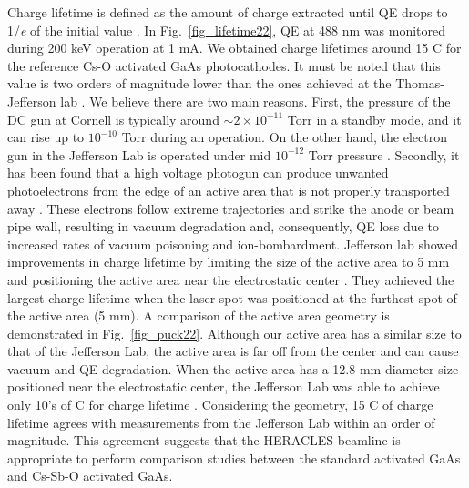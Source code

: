 Charge lifetime is defined as the amount of charge extracted until QE drops to 1/\emph{e} of the initial value \cite{grames2011_ChargeFluenceLifetime,bae2018_RuggedSpinpolarizedElectron}.
In Fig.~\ref{fig_lifetime22}, QE at 488 nm was monitored during 200 keV operation at 1 mA. 
We obtained charge lifetimes around 15 C for the reference Cs-O activated GaAs photocathodes.
It must be noted that this value is two orders of magnitude lower than the ones achieved at the Thomas-Jefferson lab \cite{grames2011_ChargeFluenceLifetime}.
We believe there are two main reasons.
First, the pressure of the DC gun at Cornell is typically around $\sim 2 \times 10^{-11}$ Torr in a standby mode, and it can rise up to $10^{-10}$ Torr during an operation. On the other hand, the electron gun in the Jefferson Lab is operated under mid $10^{-12}$ Torr pressure \cite{grames2011_ChargeFluenceLifetime}. Secondly, it has been found that a high voltage photogun can produce unwanted photoelectrons from the edge of an active area that is not properly transported away \cite{grames2011_ChargeFluenceLifetime,sinclair2007_DevelopmentHighAverage}. These electrons follow extreme trajectories and strike the anode or beam pipe wall, resulting in vacuum degradation and, consequently, QE loss due to increased rates of vacuum poisoning and ion-bombardment. Jefferson lab showed improvements in charge lifetime by limiting the size of the active area to 5 mm and positioning the active area near the electrostatic center \cite{grames2011_ChargeFluenceLifetime}.
They achieved the largest charge lifetime when the laser spot was positioned at the furthest spot of the active area (5 mm).
A comparison of the active area geometry is demonstrated in Fig.~\ref{fig_puck22}. Although our active area has a similar size to that of the Jefferson Lab, the active area is far off from the center and can cause vacuum and QE degradation. When the active area has a 12.8 mm diameter size positioned near the electrostatic center, the Jefferson Lab was able to achieve only 10's of C for charge lifetime \cite{grames2011_ChargeFluenceLifetime}.
Considering the geometry, 15 C of charge lifetime agrees with measurements from the Jefferson Lab within an order of magnitude.
This agreement suggests that the HERACLES beamline is appropriate to perform comparison studies between the standard activated GaAs and Cs-Sb-O activated GaAs.

